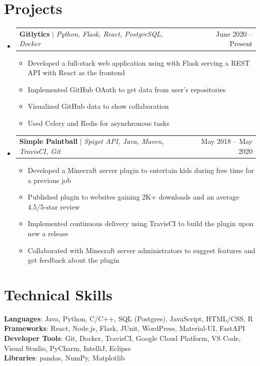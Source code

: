 \documentclass[letterpaper,11pt]{article}
\makeatletter
\newcommand{\resumeItem}[1]{
  \item\small{
    {#1 \vspace{-2pt}}
  }
}
\newcommand{\resumeProjectHeading}[2]{
    \item
    \begin{tabular*}{0.97\textwidth}{l@{\extracolsep{\fill}}r}
      \small#1 & #2 \\
    \end{tabular*}\vspace{-7pt}
}
\newcommand{\resumeSubHeadingListStart}{\begin{itemize}[leftmargin=0.15in, label={}]}
\newcommand{\resumeSubHeadingListEnd}{\end{itemize}}
\newcommand{\resumeItemListStart}{\begin{itemize}}
\newcommand{\resumeItemListEnd}{\end{itemize}\vspace{-5pt}}
\makeatother
\begin{document}
\section{Projects}
    \resumeSubHeadingListStart
      \resumeProjectHeading
          {\textbf{Gitlytics} $|$ \emph{Python, Flask, React, PostgreSQL, Docker}}{June 2020 -- Present}
          \resumeItemListStart
            \resumeItem{Developed a full-stack web application using with Flask serving a REST API with React as the frontend}
            \resumeItem{Implemented GitHub OAuth to get data from user’s repositories}
            \resumeItem{Visualized GitHub data to show collaboration}
            \resumeItem{Used Celery and Redis for asynchronous tasks}
          \resumeItemListEnd
      \resumeProjectHeading
          {\textbf{Simple Paintball} $|$ \emph{Spigot API, Java, Maven, TravisCI, Git}}{May 2018 -- May 2020}
          \resumeItemListStart
            \resumeItem{Developed a Minecraft server plugin to entertain kids during free time for a previous job}
            \resumeItem{Published plugin to websites gaining 2K+ downloads and an average 4.5/5-star review}
            \resumeItem{Implemented continuous delivery using TravisCI to build the plugin upon new a release}
            \resumeItem{Collaborated with Minecraft server administrators to suggest features and get feedback about the plugin}
          \resumeItemListEnd
    \resumeSubHeadingListEnd



%
\section{Technical Skills}
 \begin{itemize}[leftmargin=0.15in, label={}]
    \small{\item{
     \textbf{Languages}{: Java, Python, C/C++, SQL (Postgres), JavaScript, HTML/CSS, R} \\
     \textbf{Frameworks}{: React, Node.js, Flask, JUnit, WordPress, Material-UI, FastAPI} \\
     \textbf{Developer Tools}{: Git, Docker, TravisCI, Google Cloud Platform, VS Code, Visual Studio, PyCharm, IntelliJ, Eclipse} \\
     \textbf{Libraries}{: pandas, NumPy, Matplotlib}
    }}
 \end{itemize}


\end{document}
